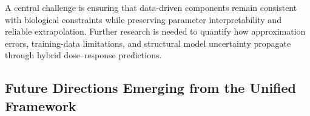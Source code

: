 \documentclass[11pt]{article}
\begin{document}
A central challenge is ensuring that data-driven
components remain consistent with biological
constraints while preserving parameter
interpretability and reliable extrapolation.
Further research is needed to quantify how
approximation errors, training-data limitations,
and structural model uncertainty propagate
through hybrid dose--response predictions.



\subsection{Future Directions Emerging from the Unified Framework}

\end{document}
